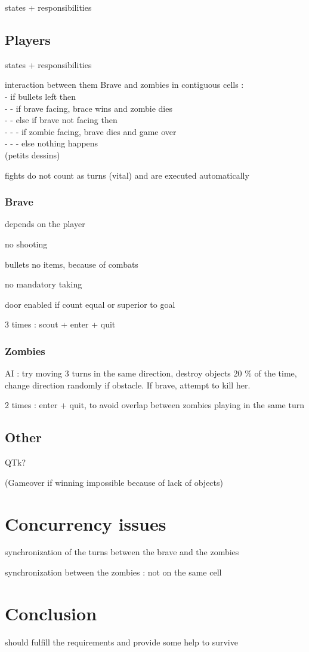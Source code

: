 \documentclass[12pt,a4paper]{article}
\begin{document}
states + responsibilities


\subsection{Players}
states + responsibilities

interaction between them
Brave and zombies in contiguous cells : \\
- if bullets left then \\
- - if brave facing, brace wins  and zombie dies\\
- - else if brave not facing then \\
- - - if zombie facing, brave dies and game over \\
- - - else nothing happens \\
(petits dessins)

fights do not count as turns (vital) and are executed automatically

\subsubsection{Brave}
depends on the player

no shooting

bullets no items, because of combats

no mandatory taking

door enabled if count equal or superior to goal

3 times : scout + enter + quit

\subsubsection{Zombies}
AI : try moving 3 turns in the same direction, destroy objects 20 \% of the time, change direction randomly if obstacle. If brave, attempt to kill her.

2 times : enter + quit, to avoid overlap between zombies playing in the same turn

\subsection{Other}
QTk?

(Gameover if winning impossible because of lack of objects)

\section{Concurrency issues}
synchronization of the turns between the brave and the zombies

synchronization between the zombies : not on the same cell
    
\section*{Conclusion}
should fulfill the requirements and provide some help to survive
    
\end{document}
